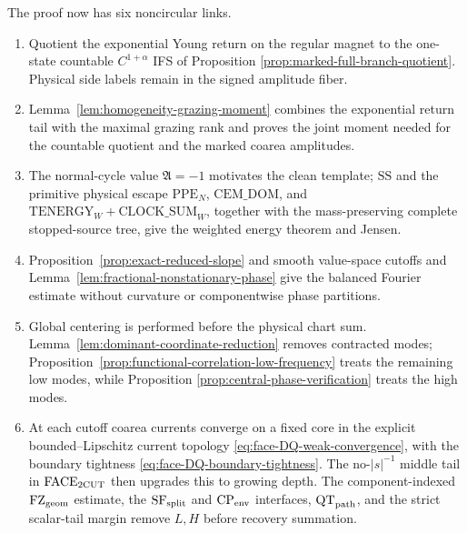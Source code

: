 \documentclass[11pt]{article}
\begin{document}
The proof now has six noncircular links.
\begin{enumerate}[label=\textup{(F\arabic*)}]
\item Quotient the exponential Young return on the regular magnet to the
      one-state countable $C^{1+\alpha}$ IFS of Proposition
      \ref{prop:marked-full-branch-quotient}.  Physical side labels remain
      in the signed amplitude fiber.
\item Lemma~\ref{lem:homogeneity-grazing-moment} combines the exponential
      return tail with the maximal grazing rank and proves the joint moment
      needed for the countable quotient and the marked coarea amplitudes.
\item The normal-cycle value $\mathfrak A=-1$ motivates the clean template;
      $\mathrm{SS}$ and the primitive physical escape
      $\mathrm{PPE}_{N}$, $\mathrm{CEM\_DOM}$, and
      $\mathrm{TENERGY}_{W}+\mathrm{CLOCK\_SUM}_{W}$, together with the
      mass-preserving complete stopped-source tree, give the weighted energy
      theorem and Jensen.
\item Proposition~\ref{prop:exact-reduced-slope} and smooth value-space
      cutoffs and Lemma~\ref{lem:fractional-nonstationary-phase} give the
      balanced Fourier estimate without curvature or componentwise phase
      partitions.
\item Global centering is performed before the physical chart sum.
      Lemma~\ref{lem:dominant-coordinate-reduction} removes contracted modes;
      Proposition~\ref{prop:functional-correlation-low-frequency} treats the
      remaining low modes, while Proposition
      \ref{prop:central-phase-verification} treats the high modes.
\item At each cutoff coarea currents converge on a fixed core in the explicit
      bounded--Lipschitz current topology
      \eqref{eq:face-DQ-weak-convergence}, with the boundary tightness
      \eqref{eq:face-DQ-boundary-tightness}.  The no-$|s|^{-1}$ middle tail
      in $\mathrm{FACE}_{\rm 2CUT}$ then upgrades this to growing depth.  The
      component-indexed $\mathrm{FZ}_{\rm geom}$ estimate, the
      $\mathrm{SF}_{\rm split}$ and $\mathrm{CP}_{\rm env}$ interfaces,
      $\mathrm{QT}_{\rm path}$, and the strict scalar-tail margin remove
      $L,H$ before recovery summation.
\end{enumerate}
\end{document}
